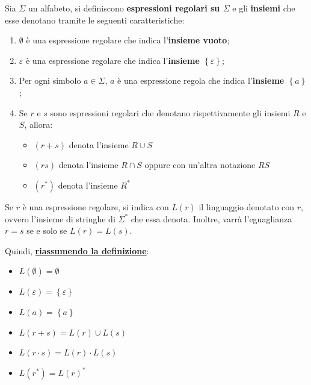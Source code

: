 \documentclass[a4paper]{article}
\begin{document}
	Sia $\Sigma$ un alfabeto, si definiscono \textcolor{Red3}{\textbf{espressioni regolari su $\Sigma$}} e gli \textbf{insiemi} che esse denotano tramite le seguenti caratteristiche:
	
	\begin{enumerate}[label=\Roman*.]
		\item $\emptyset$ è una espressione regolare che indica l'\textbf{insieme vuoto};
		
		\item $\varepsilon$ è una espressione regolare che indica l'\textbf{insieme $\left\{\varepsilon\right\}$};
		
		\item Per ogni simbolo $a \in \Sigma$, $a$ è una espressione regola che indica l'\textbf{insieme $\left\{a\right\}$};
		
		\item Se $r$ e $s$ sono espressioni regolari che denotano rispettivamente gli insiemi $R$ e $S$, allora:
			\begin{itemize}[label=-]
				\item $\left(r + s\right)$ denota l'insieme $R \cup S$
				\item $\left(rs\right)$ denota l'insieme $R \cap S$ oppure con un'altra notazione $RS$
				\item $\left(r^{*}\right)$ denota l'insieme $R^{*}$
			\end{itemize}
	\end{enumerate}

	\noindent
	Se $r$ è una espressione regolare, si indica con $L\left(r\right)$ il linguaggio denotato con $r$, ovvero l'insieme di stringhe di $\Sigma^{*}$ che essa denota. Inoltre, varrà l'eguaglianza $r = s$ se e solo se $L\left(r\right) = L\left(s\right)$.\newline
	
	\noindent
	Quindi, \textbf{\underline{riassumendo la definizione}}:
	
	\begin{itemize}[label=]
		\item $L\left(\emptyset\right) = \emptyset$
		\item $L\left(\varepsilon\right) = \left\{\varepsilon\right\}$
		\item $L\left(a\right) = \left\{a\right\}$
		\item $L\left(r+s\right) = L\left(r\right) \cup L\left(s\right)$
		\item $L\left(r \cdot s\right) = L\left(r\right) \cdot L\left(s\right)$
		\item $L\left(r^{*}\right) = L\left(r\right)^{*}$
	\end{itemize}
\end{document}
